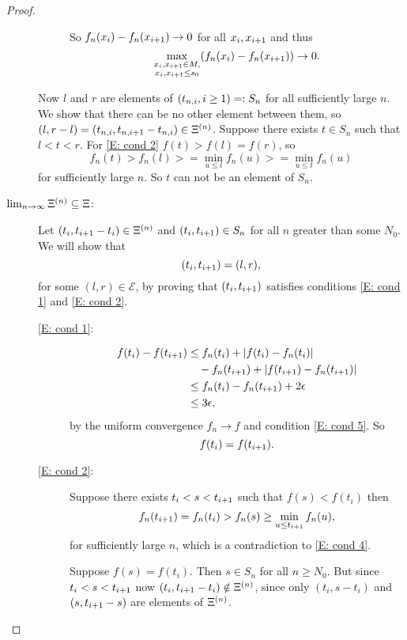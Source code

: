 \begin{proof}
\begin{description}
\begin{description}
So $f_n(x_i) - f_n(x_{i+1}) \rightarrow 0$ for all $x_i, x_{i+1}$ and thus 
\begin{equation*}
\max_{\substack{x_i, x_{i+1} \in M, \\ x_i, x_{i+1} \leq s_0}} (f_n(x_i) - f_n(x_{i+1})) \rightarrow 0.
\end{equation*}
\end{description} %
Now $l$ and $r$ are elements of $(t_{n, i}, i \geq 1) =: S_n$ for all sufficiently large $n$.
We show that there can be no other element between them, 
so $(l, r-l) = (t_{n, i}, t_{n, i+1} - t_{n, i}) \in \Xi^{(n)}$.
Suppose there exists $t \in S_n$ such that $l < t < r$.
For \eqref{E: cond 2} $f(t) > f(l) = f(r)$, so
\begin{equation*}
f_n(t) > f_n(l) >= \min_{u \leq l} f_n(u) >= \min_{u \leq t} f_n(u)
\end{equation*}
for sufficiently large $n$. So $t$ can not be an element of $S_n$.

\item[$\lim_{n \rightarrow \infty} \Xi^{(n)} \subseteq \Xi$:]
Let $(t_i, t_{i+1} - t_i) \in \Xi^{(n)}$ and $(t_i, t_{i+1}) \in S_n$
for all $n$ greater than some $N_0$.
We will show that
\begin{equation}
(t_i, t_{i+1} ) = (l,r),
\end{equation}
for some $(l,r) \in \mathcal{E}$,
by proving that $(t_i, t_{i+1})$ satisfies conditions \eqref{E: cond 1} and \eqref{E: cond 2}.


\begin{description} %
	\item[\eqref{E: cond 1}:]
\begin{equation}
\begin{aligned}
f(t_i) - f(t_{i+1}) 
&\leq f_n(t_i) + |f(t_i) - f_n(t_i)| \\
&\quad- f_n(t_{i+1}) + |f(t_{i+1}) - f_n(t_{i+1})| \\
&\leq f_n(t_i) - f_n(t_{i+1}) + 2\epsilon \\
&\leq 3\epsilon,
\end{aligned}
\end{equation}
by the uniform convergence $f_n \rightarrow f$ and condition \eqref{E: cond 5}.
So
\begin{equation}
f(t_i) = f(t_{i+1}).
\end{equation}

	\item[\eqref{E: cond 2}:]
Suppose there exists $t_i < s < t_{i+1}$ such that
$f(s) < f(t_i)$
then
\begin{equation*}
f_n(t_{i+1}) = f_n(t_i) > f_n(s) \geq \min_{u \leq t_{i+1}}f_n(u),
\end{equation*}
for sufficiently large $n$, which is a contradiction to \eqref{E: cond 4}.

Suppose $f(s) = f(t_i)$. Then $s \in S_n$ for all $n \geq N_0$.
But since $t_i < s < t_{i+1}$ now $(t_i, t_{i+1} - t_i) \notin \Xi^{(n)}$,
since only $(t_i, s - t_i)$ and $(s, t_{i+1} - s)$ are elements of $\Xi^{(n)}$.
\end{description} %
\end{description} %
\end{proof}
